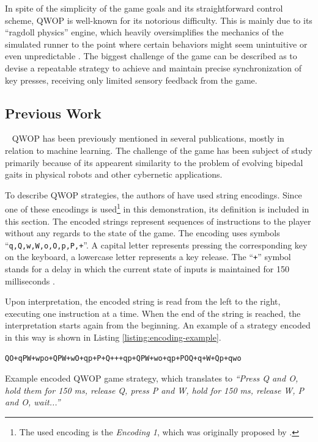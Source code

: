 In spite of the simplicity of the game goals and its straightforward control scheme, QWOP is well-known for its notorious difficulty. This is mainly due to its ``ragdoll physics'' engine, which heavily oversimplifies the mechanics of the simulated runner to the point where certain behaviors might seem unintuitive or even unpredictable \cite{QwopHomework}. The biggest challenge of the game can be described as to devise a repeatable strategy to achieve and maintain precise synchronization of key presses, receiving only limited sensory feedback from the game.

\subsection{Previous Work}~\label{section:qwop-previous-work}
QWOP has been previously mentioned in several publications, mostly in relation to machine learning. The challenge of the game has been subject of study primarily because of its appearent similarity to the problem of evolving bipedal gaits in physical robots and other cybernetic applications.

To describe QWOP strategies, the authors of \cite{EvolvingQwopGaits} have used string encodings. Since one of these encodings is used\footnote{The used encoding is the \textit{Encoding 1}, which was originally proposed by \cite{QwopEncoding}.} in this demonstration, its definition is included in this section. The encoded strings represent sequences of instructions to the player without any regards to the state of the game. The encoding uses symbols ``\texttt{q,Q,w,W,o,O,p,P,+}''. A capital letter represents pressing the corresponding key on the keyboard, a lowercase letter represents a key release. The ``\texttt{+}'' symbol stands for a delay in which the current state of inputs is maintained for 150 milliseconds \cite{EvolvingQwopGaits}.

Upon interpretation, the encoded string is read from the left to the right, executing one instruction at a time. When the end of the string is reached, the interpretation starts again from the beginning. An example of a strategy encoded in this way is shown in Listing \ref{listing:encoding-example}.

\begin{listing}[ht]
	\begin{verbatim}
QO+qPW+wpo+QPW+wO+qp+P+Q+++qp+QPW+wo+qp+POQ+q+W+Qp+qwo
	\end{verbatim}
	\caption[Example encoded QWOP game strategy.]{Example encoded QWOP game strategy, which translates to \textit{``Press Q and O, hold them for 150 ms, release Q, press P and W, hold for 150 ms, release W, P and O, wait...''} \cite{EvolvingQwopGaits}}
	\label{listing:encoding-example}
\end{listing}

